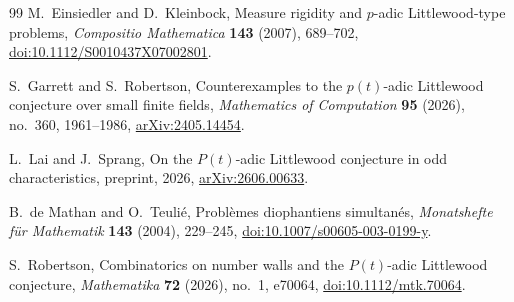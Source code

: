 \documentclass[11pt]{article}
\theoremstyle{remark}
\begin{document}
\begin{thebibliography}{99}
M.~Einsiedler and D.~Kleinbock,
\newblock Measure rigidity and $p$-adic Littlewood-type problems,
\newblock \emph{Compositio Mathematica} \textbf{143} (2007), 689--702,
\newblock \href{https://doi.org/10.1112/S0010437X07002801}
{doi:10.1112/S0010437X07002801}.

S.~Garrett and S.~Robertson,
\newblock Counterexamples to the $p(t)$-adic Littlewood conjecture over small
finite fields,
\newblock \emph{Mathematics of Computation} \textbf{95} (2026), no.~360,
1961--1986,
\newblock \href{https://arxiv.org/abs/2405.14454}{arXiv:2405.14454}.

L.~Lai and J.~Sprang,
\newblock On the $P(t)$-adic Littlewood conjecture in odd characteristics,
\newblock preprint, 2026,
\newblock \href{https://arxiv.org/abs/2606.00633}{arXiv:2606.00633}.

B.~de Mathan and O.~Teuli\'e,
\newblock Probl\`emes diophantiens simultan\'es,
\newblock \emph{Monatshefte f\"ur Mathematik} \textbf{143} (2004), 229--245,
\newblock \href{https://doi.org/10.1007/s00605-003-0199-y}
{doi:10.1007/s00605-003-0199-y}.

S.~Robertson,
\newblock Combinatorics on number walls and the $P(t)$-adic Littlewood
conjecture,
\newblock \emph{Mathematika} \textbf{72} (2026), no.~1, e70064,
\newblock \href{https://doi.org/10.1112/mtk.70064}
{doi:10.1112/mtk.70064}.

\end{thebibliography}
\end{document}
